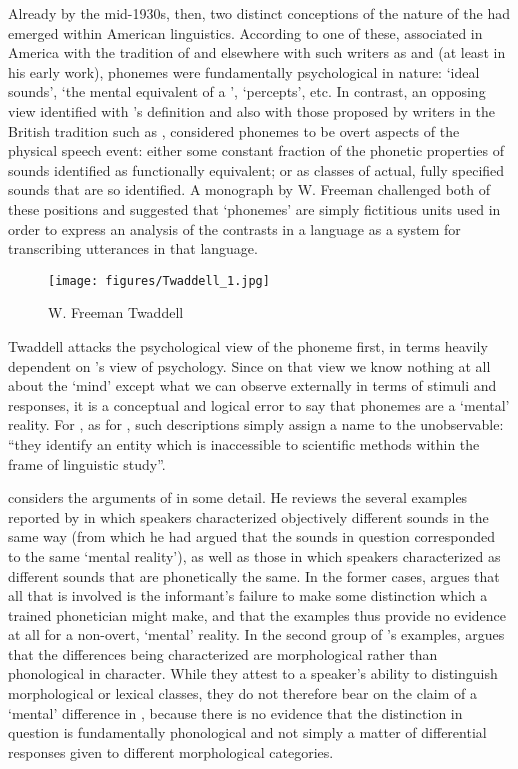 Already by the mid-1930s, then, two distinct conceptions of the nature
of the  had emerged within American linguistics. According to
one of these, associated in America with the tradition of {\Sapir} and
elsewhere with such writers as {\DeCourtenay} and {\Trubetzkoy}
(at least in his early work), phonemes were fundamentally
psychological in nature: `ideal sounds', `the mental equivalent of a
', `percepts', etc. In {contrast}, an opposing view
identified with {\Bloomfield}'s definition and also with those proposed
by writers in the British tradition such as , considered
phonemes to be overt aspects of the physical speech event: either some
constant fraction of the phonetic properties of sounds identified as
functionally equivalent; or as classes of actual, fully specified
sounds that are so identified. A monograph by W. Freeman
\citet{twaddell35:on.defining} challenged both of these positions and
suggested that `phonemes' are simply fictitious units used in order to
express an analysis of the contrasts in a language as a system for
transcribing utterances in that language.

\begin{wrapfigure}{r}{.6\textwidth}
  \texttt{[image: figures/Twaddell\_1.jpg]}
  \caption{W. Freeman Twaddell}
  \label{fig:ch.structuralists.twaddell}
\end{wrapfigure}
Twaddell attacks the psychological view of the pho\-neme first, in
terms heavily dependent on {\Bloomfield}'s view of psychology. Since on
that view we know nothing at all about the `mind' except what we can
observe externally in terms of stimuli and responses, it is a
conceptual and logical error to say that phonemes are a `mental'
reality. For {\Twaddell}, as for {\Bloomfield}, such descriptions simply
assign a name to the unobservable: ``they identify an entity which is
inaccessible to scientific methods within the frame of linguistic
study''\citet[9]{twaddell35:on.defining}.

\largerpage
{\Twaddell} considers the arguments of
\citet{sapir25:sound.patterns,sapir33:reality} in some detail. He
reviews the several examples reported by {\Sapir} in which speakers
characterized objectively different sounds in the same way (from which
he had argued that the sounds in question corresponded to the same
`mental reality'), as well as those in which speakers characterized as
different sounds that are phonetically the same. In the former cases,
{\Twaddell} argues that all that is involved is the informant's failure
to make some distinction which a trained phonetician might make, and
that the examples thus provide no evidence at all for a non-overt,
`mental' reality. In the second group of {\Sapir}'s examples, {\Twaddell}
argues that the differences being characterized are morphological
rather than phonological in character. While they attest to a
speaker's ability to distinguish morphological or lexical classes,
they do not therefore bear on the claim of a `mental' difference in
, because there is no evidence that the
distinction in question is fundamentally phonological and not simply a
matter of differential responses given to different morphological
categories.

